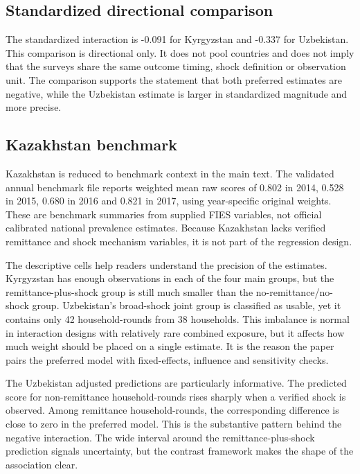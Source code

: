 \documentclass[11pt]{article}
\begin{document}
\subsection{Standardized directional comparison}

The standardized interaction is -0.091 for Kyrgyzstan and -0.337 for Uzbekistan. This comparison is directional only. It does not pool countries and does not imply that the surveys share the same outcome timing, shock definition or observation unit. The comparison supports the statement that both preferred estimates are negative, while the Uzbekistan estimate is larger in standardized magnitude and more precise.

\subsection{Kazakhstan benchmark}

Kazakhstan is reduced to benchmark context in the main text. The validated annual benchmark file reports weighted mean raw scores of 0.802 in 2014, 0.528 in 2015, 0.680 in 2016 and 0.821 in 2017, using year-specific original weights. These are benchmark summaries from supplied FIES variables, not official calibrated national prevalence estimates. Because Kazakhstan lacks verified remittance and shock mechanism variables, it is not part of the regression design.

The descriptive cells help readers understand the precision of the estimates. Kyrgyzstan has enough observations in each of the four main groups, but the remittance-plus-shock group is still much smaller than the no-remittance/no-shock group. Uzbekistan's broad-shock joint group is classified as usable, yet it contains only 42 household-rounds from 38 households. This imbalance is normal in interaction designs with relatively rare combined exposure, but it affects how much weight should be placed on a single estimate. It is the reason the paper pairs the preferred model with fixed-effects, influence and sensitivity checks.

The Uzbekistan adjusted predictions are particularly informative. The predicted score for non-remittance household-rounds rises sharply when a verified shock is observed. Among remittance household-rounds, the corresponding difference is close to zero in the preferred model. This is the substantive pattern behind the negative interaction. The wide interval around the remittance-plus-shock prediction signals uncertainty, but the contrast framework makes the shape of the association clear.
\end{document}
